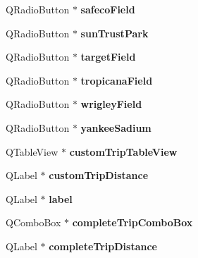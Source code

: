 \begin{DoxyCompactItemize}
Q\+Radio\+Button $\ast$ {\bfseries safeco\+Field}
\item 
\mbox{\label{class_ui___main_window_a610e68a13493ec1713507143a47d2f11}} 
Q\+Radio\+Button $\ast$ {\bfseries sun\+Trust\+Park}
\item 
\mbox{\label{class_ui___main_window_ad6c99fcd634cb966cb1fd95d559ebc9c}} 
Q\+Radio\+Button $\ast$ {\bfseries target\+Field}
\item 
\mbox{\label{class_ui___main_window_a92a31d42f1f17526f0d7b205c8977b6f}} 
Q\+Radio\+Button $\ast$ {\bfseries tropicana\+Field}
\item 
\mbox{\label{class_ui___main_window_afeede17d4d054220a31e7f477a96d3a1}} 
Q\+Radio\+Button $\ast$ {\bfseries wrigley\+Field}
\item 
\mbox{\label{class_ui___main_window_a1d8ef431926d15ba395a8c16b1cfc034}} 
Q\+Radio\+Button $\ast$ {\bfseries yankee\+Sadium}
\item 
\mbox{\label{class_ui___main_window_a8b0fb0216625ee9aff9af81e14e43769}} 
Q\+Table\+View $\ast$ {\bfseries custom\+Trip\+Table\+View}
\item 
\mbox{\label{class_ui___main_window_a07072f802ca149c027ef52af5b0ea193}} 
Q\+Label $\ast$ {\bfseries custom\+Trip\+Distance}
\item 
\mbox{\label{class_ui___main_window_ad9c89133780f28e6efa2ec17ceb9cff5}} 
Q\+Label $\ast$ {\bfseries label}
\item 
\mbox{\label{class_ui___main_window_af0b3c8b3f79be2d6445141a79401fbf7}} 
Q\+Combo\+Box $\ast$ {\bfseries complete\+Trip\+Combo\+Box}
\item 
\mbox{\label{class_ui___main_window_a1e4c229e6adbe35e025f93b514b97cee}} 
Q\+Label $\ast$ {\bfseries complete\+Trip\+Distance}
\item 
\mbox{\label{class_ui___main_window_ad093e300d6fdc4fa6721af1b91a83f51}} 

\end{DoxyCompactItemize}
